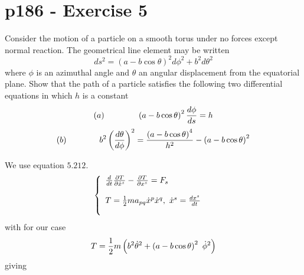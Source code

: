 \section{p186 - Exercise 5}
\begin{tcolorbox}
Consider the motion of a particle on a smooth torus under no forces except normal reaction. The geometrical line element may be written $$ ds^2=\left(a-b\cos \theta \right)^2 d{\phi}^2+b^2 d\theta^2$$ where $\phi$ is an azimuthal angle and $\theta$ an angular displacement from the equatorial plane. Show that  the path of a particle satisfies the following two differential equations in which $h$ is a constant 
$$(a)\quad\quad\quad\quad \left(a-b\cos\theta\right)^2\dv{\phi}{s} = h$$
$$(b)\quad\quad\quad\quad b^2\left(\dv{\theta}{\phi}\right)^2= \frac{\left(a-b\cos\theta\right)^4}{h^2}-\left(a-b\cos\theta\right)^2$$
\end{tcolorbox}
We use equation $\mathbf{5.212.}$
\begin{align}
&\left\{\begin{array}{l}
\dv{}{t}\frac{\partial T}{\partial \dot{x}^s} - \frac{\partial T}{\partial x^s} = F_{s}\\\\
T = \frac{1}{2} m a_{pq}\dot{x}^p\dot{x}^q, \ \dot{x}^s=\dv{x^s}{t}\\\\
\end{array}\right.
\end{align}
with for our case
\begin{align}
T = \half m \left(b^2\dot{\theta}^2+ \left(a-b\cos \theta \right)^2  \ \dot{\phi}^2 \right)
\end{align}giving
